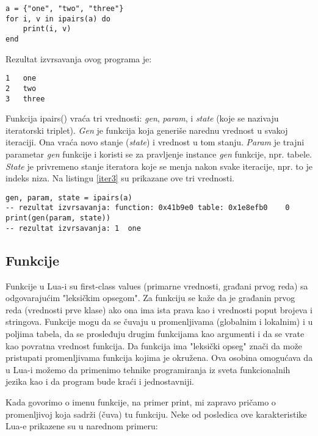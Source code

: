 \documentclass[a4paper]{article}
\begin{document}
\begin{lstlisting}[caption={Primer iteratora bez stanja},frame=single, label=iter2]
a = {"one", "two", "three"}
for i, v in ipairs(a) do
	print(i, v)
end
\end{lstlisting}
Rezultat izvrsavanja ovog programa je:
\begin{verbatim}
1	one
2	two
3	three
\end{verbatim}
Funkcija ipairs() vraća tri vrednosti: \textit{gen}, \textit{param}, i \textit{state} (koje se nazivaju iteratorski triplet). \textit{Gen} je funkcija koja generiše narednu vrednost u svakoj iteraciji. Ona vraća novo stanje (\textit{state}) i vrednost u tom stanju. \textit{Param} je trajni parametar \textit{gen} funkcije i koristi se za pravljenje instance \textit{gen} funkcije, npr. tabele. \textit{State} je privremeno stanje iteratora koje se menja nakon svake iteracije, npr. to je indeks niza\cite{luafun_ipairs}. Na listingu \ref{iter3} su prikazane ove tri vrednosti.
\begin{lstlisting}[caption={Primer iteratora bez stanja (nastavak)},frame=single, label=iter3]
gen, param, state = ipairs(a)
-- rezultat izvrsavanja: function: 0x41b9e0	table: 0x1e8efb0	0
print(gen(param, state))
-- rezultat izvrsavanja: 1	one
\end{lstlisting}


\subsection{Funkcije}
Funkcije u Lua-i su first-class values (primarne vrednosti, građani prvog reda) sa odgovarajućim "leksičkim opsegom". Za funkciju se kaže da je građanin prvog reda (vrednosti prve klase) ako ona ima ista prava kao i vrednosti poput brojeva i stringova. Funkcije mogu da se čuvaju u promenljivama (globalnim i lokalnim) i u poljima tabela, da se prosleđuju drugim funkcijama kao argumenti i da se vrate kao povratna vrednost funkcija. Da funkcija ima "leksički opseg" znači da može pristupati promenljivama funkcija kojima je okružena. Ova osobina omogućava da u Lua-i možemo da primenimo tehnike programiranja iz sveta funkcionalnih jezika kao i da program bude kraći i jednostavniji.

Kada govorimo o imenu funkcije, na primer print, mi zapravo pričamo o promenljivoj koja sadrži (čuva) tu funkciju. Neke od posledica ove karakteristike Lua-e prikazene su u narednom primeru:
\end{document}
